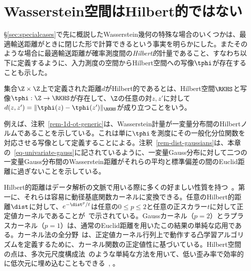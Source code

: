 \section{Wasserstein空間はHilbert的ではない}\label{sec-non-embeddability}

\S\ref{sec:specialcases}で先に概説したWasserstein幾何の特殊な場合のいくつかは、最適輸送距離がときに閉じた形で計算できるという事実を明らかにした。またそのような場合に最適輸送距離が確率測度間の\emph{Hilbert的}計量であること、すなわち以下に定義するように、入力測度の空間からHilbert空間への写像$\tphi$が存在することも示した。

\begin{defn}\label{def-Hilbertmetric}
集合$\Z\times \Z$上で定義された距離$d$がHilbert的であるとは、Hilbert空間$\RKHS$と写像$\tphi:\Z\rightarrow \RKHS$が存在して、$\Z$の任意の対$z,z'$に対して$d(z,z')=\|\tphi(z)-\tphi(z')\|_\RKHS$が成り立つことをいう。
\end{defn}

例えば、注釈~\ref{rem-1d-ot-generic}は、Wasserstein計量が一変量分布間のHilbertノルムであることを示している。これは単に$\tphi$を測度にその一般化分位関数を対応させる写像として定義することによる。注釈~\ref{rem-dist-gaussians}は、本章の~\eqref{eq-univariate-gauss}に記されているように、一変量Gauss分布に対して二つの一変量Gauss分布間のWasserstein距離がそれらの平均と標準偏差の間のEuclid距離に過ぎないことを示している。

Hilbert的距離はデータ解析の文脈で用いる際に多くの好ましい性質を持つ~\citep{dattorro2010convex}。第一に、それらは容易に動径基底関数カーネルに変換できる。任意のHilbert的距離$\dist$に対して、$e^{-\dist^p/t}$は任意の$0\leq p\leq 2$と任意の正スカラー$t$に対して正定値カーネルであることが~\citep[Cor. 3.3.3, Prop. 3.2.7]{berg84harmonic}で示されている。Gaussカーネル（$p=2$）とラプラスカーネル（$p=1$）は、通常のEuclid距離を用いたこの結果の単純な応用である。カーネル法の全分野~\citep{Hofmann2008}は、正定値カーネル行列上で動作する凸学習アルゴリズムを定義するために、カーネル関数の正定値性に基づいている。Hilbert空間の点は、多次元尺度構成法~\citep{borg2005modern}のような単純な方法を用いて、低い歪み率で効率的に低次元に埋め込むこともできる~\citep{Johnson84}, \citep[\S V.6.2]{barvinok2002course}。

